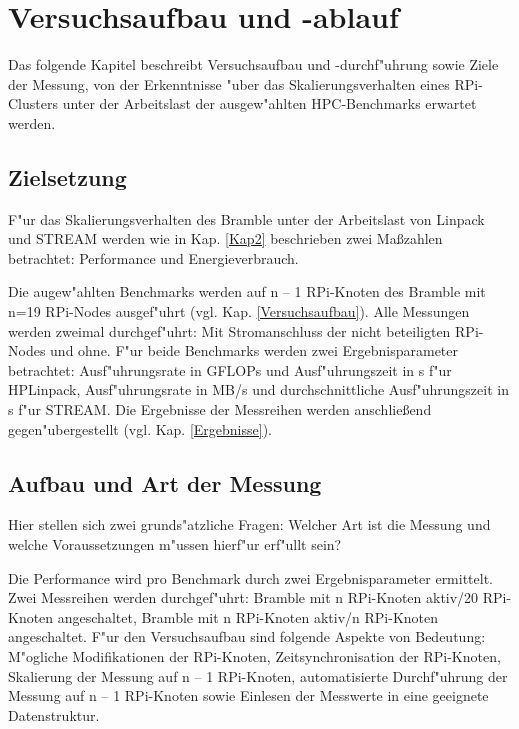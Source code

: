 \chapter{Versuchsaufbau und -ablauf}\label{Kap3}

Das folgende Kapitel beschreibt Versuchsaufbau und -durchf"uhrung sowie Ziele der Messung, von der Erkenntnisse "uber das Skalierungsverhalten eines RPi-Clusters unter der Arbeitslast der ausgew"ahlten HPC-Benchmarks erwartet werden. 

\section{Zielsetzung}\label{Ziel}

F"ur das Skalierungsverhalten des Bramble unter der Arbeitslast von Linpack und STREAM werden wie in Kap. \ref{Kap2} beschrieben zwei Ma\ss zahlen betrachtet: Performance und Energieverbrauch.

Die augew"ahlten Benchmarks werden auf n -- 1 RPi-Knoten des Bramble mit n=19 RPi-Nodes ausgef"uhrt (vgl. Kap. \ref{Versuchsaufbau}). Alle Messungen werden zweimal durchgef"uhrt: Mit Stromanschluss der nicht beteiligten RPi-Nodes und ohne. F"ur beide Benchmarks werden zwei Ergebnisparameter betrachtet: Ausf"uhrungsrate in GFLOPs und Ausf"uhrungszeit in s f"ur HPLinpack, Ausf"uhrungsrate in MB/s und durchschnittliche Ausf"uhrungszeit in s f"ur STREAM. Die Ergebnisse der Messreihen werden anschlie\ss end gegen"ubergestellt (vgl. Kap. \ref{Ergebnisse}). 

\section{Aufbau und Art der Messung}\label{Aufbau}

Hier stellen sich zwei grunds"atzliche Fragen: Welcher Art ist die Messung und welche Voraussetzungen m"ussen hierf"ur erf"ullt sein? 

Die Performance wird pro Benchmark durch zwei Ergebnisparameter ermittelt. Zwei Mess\-reihen werden durchgef"uhrt: Bramble mit n RPi-Knoten aktiv/20 RPi-Knoten angeschaltet, Bramble mit n RPi-Knoten aktiv/n RPi-Knoten angeschaltet. 
F"ur den Versuchsaufbau sind folgende Aspekte von Bedeutung: M"ogliche Modifikationen der RPi-Knoten, Zeitsynchronisation der RPi-Knoten, Skalierung der Messung auf n -- 1 RPi-Knoten, automatisierte Durchf"uhrung der Messung auf n -- 1 RPi-Knoten sowie Einlesen der Messwerte in eine geeignete Datenstruktur. 

